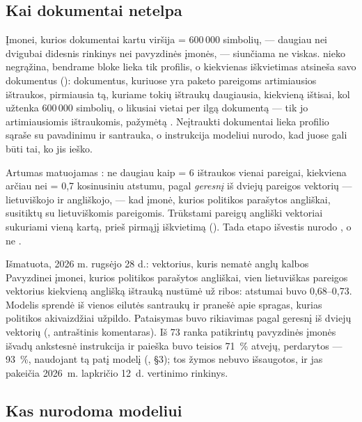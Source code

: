 \subsection{Kai dokumentai netelpa}

Įmonei, kurios dokumentai kartu viršija  = 600\,000 simbolių, ---
daugiau nei dvigubai didesnis rinkinys nei pavyzdinės įmonės, --- siunčiama ne viskas.
 nieko negrąžina, bendrame bloke lieka tik profilis, o kiekvienas
iškvietimas atsineša savo dokumentus (): dokumentus, kuriuose yra paketo
pareigoms artimiausios ištraukos, pirmiausia tą, kuriame tokių ištraukų daugiausia, kiekvieną
ištisai, kol užtenka 600\,000 simbolių, o likusiai vietai per ilgą dokumentą --- tik jo
artimiausiomis ištraukomis, pažymėtą . Neįtraukti dokumentai lieka profilio
sąraše su pavadinimu ir santrauka, o instrukcija modeliui nurodo, kad juose gali būti tai, ko jis
ieško.

Artumas matuojamas : ne daugiau kaip  = 6
ištraukos vienai pareigai, kiekviena arčiau nei  = 0,7 kosinusiniu
atstumu, pagal \emph{geresnį} iš dviejų pareigos vektorių --- lietuviškojo ir angliškojo, --- kad
įmonė, kurios politikos parašytos angliškai, susitiktų su lietuviškomis pareigomis. Trūkstami
pareigų angliški vektoriai sukuriami vieną kartą, prieš pirmąjį iškvietimą
(). Tada etapo išvestis  nurodo , o ne
.

\begin{lessonbox}{Išmatuota, 2026 m. rugsėjo 28 d.: vektorius, kuris nematė anglų kalbos}
Pavyzdinei įmonei, kurios politikos parašytos angliškai, vien lietuviškas pareigos vektorius
kiekvieną anglišką ištrauką nustūmė už ribos: atstumai buvo 0,68--0,73. Modelis sprendė iš
vienos eilutės santraukų ir pranešė apie spragas, kurias politikos akivaizdžiai užpildo.
Pataisymas buvo rikiavimas pagal geresnį iš dviejų vektorių (,
antraštinis komentaras). Iš 73 ranka patikrintų pavyzdinės įmonės išvadų ankstesnė instrukcija
ir paieška buvo teisios 71~\% atvejų, perdarytos --- 93~\%, naudojant tą patį modelį
(, §3); tos žymos nebuvo išsaugotos, ir jas pakeičia 2026~m.
lapkričio 12~d. vertinimo rinkinys.
\end{lessonbox}

\subsection{Kas nurodoma modeliui}

